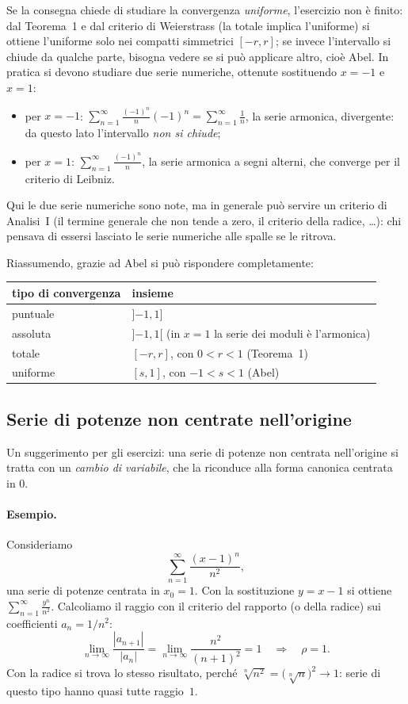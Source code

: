 Se la consegna chiede di studiare la convergenza \emph{uniforme}, l'esercizio non è finito: dal Teorema~1 e dal
criterio di Weierstrass (la totale implica l'uniforme) si ottiene l'uniforme solo nei compatti simmetrici
$[-r,r]$; se invece l'intervallo si chiude da qualche parte, bisogna vedere se si può applicare altro, cioè Abel.
In pratica si devono studiare due serie numeriche, ottenute sostituendo $x=-1$ e $x=1$:
\begin{itemize}
  \item per $x=-1$:
        $\displaystyle \sum_{n=1}^{\infty} \frac{(-1)^n}{n}(-1)^n = \sum_{n=1}^{\infty} \frac{1}{n}$,
        la serie armonica, divergente: da questo lato l'intervallo \emph{non si chiude};
  \item per $x=1$: $\displaystyle \sum_{n=1}^{\infty} \frac{(-1)^n}{n}$, la serie armonica a segni alterni,
        che converge per il criterio di Leibniz.
\end{itemize}
Qui le due serie numeriche sono note, ma in generale può servire un criterio di Analisi~I (il termine generale
che non tende a zero, il criterio della radice, \dots): chi pensava di essersi lasciato le serie numeriche alle
spalle se le ritrova.

Riassumendo, grazie ad Abel si può rispondere completamente:
\begin{center}
\begin{tabular}{ll}
  \hline
  tipo di convergenza & insieme \\
  \hline
  puntuale   & $]{-1},1]$ \\
  assoluta   & $]{-1},1[$ \quad (in $x=1$ la serie dei moduli è l'armonica) \\
  totale     & $[-r,r]$, con $0<r<1$ \quad (Teorema~1) \\
  uniforme   & $[s,1]$, con $-1<s<1$ \quad (Abel) \\
  \hline
\end{tabular}
\end{center}

\subsection{Serie di potenze non centrate nell'origine}

Un suggerimento per gli esercizi: una serie di potenze non centrata nell'origine si tratta con un
\emph{cambio di variabile}, che la riconduce alla forma canonica centrata in $0$.

\paragraph{Esempio.}
Consideriamo
\[
  \sum_{n=1}^{\infty} \frac{(x-1)^n}{n^2} ,
\]
una serie di potenze centrata in $x_0=1$. Con la sostituzione $y = x-1$ si ottiene $\sum_{n=1}^{\infty}
\frac{y^n}{n^2}$. Calcoliamo il raggio con il criterio del rapporto (o della radice) sui coefficienti
$a_n = 1/n^2$:
\[
  \lim_{n\to\infty} \frac{|a_{n+1}|}{|a_n|} = \lim_{n\to\infty} \frac{n^2}{(n+1)^2} = 1
  \quad\Longrightarrow\quad \rho = 1 .
\]
Con la radice si trova lo stesso risultato, perché $\sqrt[n]{n^2} = \bigl(\sqrt[n]{n}\bigr)^2 \to 1$: serie di
questo tipo hanno quasi tutte raggio~$1$.

